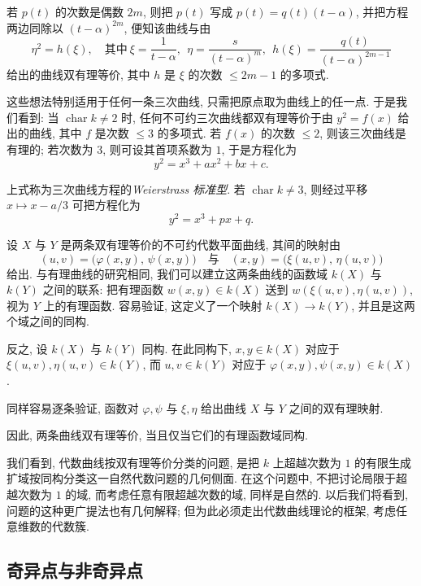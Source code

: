 若 $p(t)$ 的次数是偶数 $2m$, 则把 $p(t)$ 写成 $p(t) = q(t)(t - \alpha)$, 并把方程两边同除以 $(t-\alpha)^{2m}$, 便知该曲线与由
\[
	\eta^2 = h(\xi), \quad \text{其中}\ \xi = \frac{1}{t - \alpha},\ \ \eta = \frac{s}{(t-\alpha)^m},\ \ h(\xi) = \frac{q(t)}{(t-\alpha)^{2m-1}}
\]
给出的曲线双有理等价, 其中 $h$ 是 $\xi$ 的次数 $\le 2m-1$ 的多项式.

这些想法特别适用于任何一条三次曲线, 只需把原点取为曲线上的任一点. 于是我们看到: 当 $\operatorname{char} k \ne 2$ 时, 任何不可约三次曲线都双有理等价于由 $y^2 = f(x)$ 给出的曲线, 其中 $f$ 是次数 $\le 3$ 的多项式. 若 $f(x)$ 的次数 $\le 2$, 则该三次曲线是有理的; 若次数为 $3$, 则可设其首项系数为 $1$, 于是方程化为
\[
	y^2 = x^3 + ax^2 + bx + c.
\]

\begin{definition}\label{def:weierstrass}
	上式称为三次曲线方程的\emph{Weierstrass 标准型}. 若 $\operatorname{char} k \ne 3$, 则经过平移 $x \mapsto x - a/3$ 可把方程化为
	\begin{equation}
		\label{eq:1.10}
		y^2 = x^3 + px + q.
	\end{equation}
\end{definition}

设 $X$ 与 $Y$ 是两条双有理等价的不可约代数平面曲线, 其间的映射由
\[
	(u, v) = \bigl(\varphi(x,y),\, \psi(x,y)\bigr) \quad\text{与}\quad (x, y) = \bigl(\xi(u,v),\, \eta(u,v)\bigr)
\]
给出. 与有理曲线的研究相同, 我们可以建立这两条曲线的函数域 $k(X)$ 与 $k(Y)$ 之间的联系: 把有理函数 $w(x,y) \in k(X)$ 送到 $w(\xi(u,v), \eta(u,v))$, 视为 $Y$ 上的有理函数. 容易验证, 这定义了一个映射 $k(X) \to k(Y)$, 并且是这两个域之间的同构.

反之, 设 $k(X)$ 与 $k(Y)$ 同构. 在此同构下, $x, y \in k(X)$ 对应于 $\xi(u,v), \eta(u,v) \in k(Y)$, 而 $u, v \in k(Y)$ 对应于 $\varphi(x,y), \psi(x,y) \in k(X)$.

同样容易逐条验证, 函数对 $\varphi, \psi$ 与 $\xi, \eta$ 给出曲线 $X$ 与 $Y$ 之间的双有理映射.

因此, 两条曲线双有理等价, 当且仅当它们的有理函数域同构.

我们看到, 代数曲线按双有理等价分类的问题, 是把 $k$ 上超越次数为 $1$ 的有限生成扩域按同构分类这一自然代数问题的几何侧面. 在这个问题中, 不把讨论局限于超越次数为 $1$ 的域, 而考虑任意有限超越次数的域, 同样是自然的. 以后我们将看到, 问题的这种更广提法也有几何解释; 但为此必须走出代数曲线理论的框架, 考虑任意维数的代数簇.

\subsection{奇异点与非奇异点}

